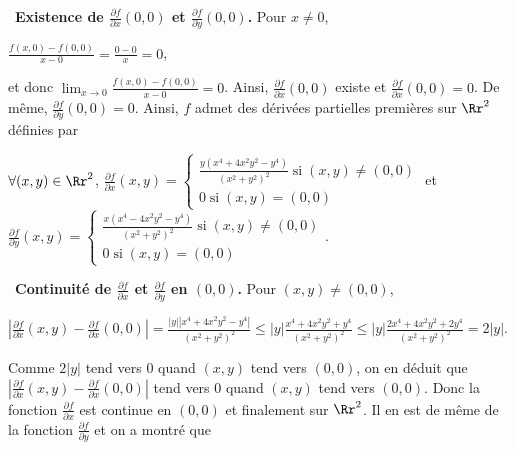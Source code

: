 {{\textbullet~\textbf{Existence de $ \frac{\partial f}{\partial x}(0,0)$ et $ \frac{\partial f}{\partial y}(0,0)$.} Pour $x\neq0$,

\begin{center}
$ \frac{f(x,0)-f(0,0)}{x-0}= \frac{0-0}{x}=0$,
\end{center}

et donc $\lim_{x \rightarrow 0} \frac{f(x,0)-f(0,0)}{x-0}=0$. Ainsi, $ \frac{\partial f}{\partial x}(0,0)$ existe et $ \frac{\partial f}{\partial x}(0,0)=0$. De même, $ \frac{\partial f}{\partial y}(0,0)=0$. Ainsi, $f$ admet des dérivées partielles premières sur $\Rr^2$ définies par

\begin{center}
$\forall(x,y)\in\Rr^2$, $ \frac{\partial f}{\partial x}(x,y)=\left\{
\begin{array}{l}
 \frac{y(x^4+4x^2y^2-y^4)}{(x^2+y^2)^2}\;\text{si}\;(x,y)\neq(0,0)\\
0\;\text{si}\;(x,y)=(0,0)
\end{array}
\right.$ et $ \frac{\partial f}{\partial y}(x,y)=\left\{
\begin{array}{l}
 \frac{x(x^4-4x^2y^2-y^4)}{(x^2+y^2)^2}\;\text{si}\;(x,y)\neq(0,0)\\
0\;\text{si}\;(x,y)=(0,0)
\end{array}
\right.$.
\end{center}

\textbullet~\textbf{Continuité de $ \frac{\partial f}{\partial x}$ et $ \frac{\partial f}{\partial y}$ en $(0,0)$.} Pour $(x,y)\neq(0,0)$,

\begin{center}
$\left| \frac{\partial f}{\partial x}(x,y)- \frac{\partial f}{\partial x}(0,0)\right|= \frac{|y||x^4+4x^2y^2-y^4|}{(x^2+y^2)^2}\leqslant|y| \frac{x^4+4x^2y^2+y^4}{(x^2+y^2)^2}\leqslant|y| \frac{2x^4+4x^2y^2+2y^4}{(x^2+y^2)^2}=2|y|$.
\end{center}

Comme $2|y|$ tend vers $0$ quand $(x,y)$ tend vers $(0,0)$, on en déduit que $\left| \frac{\partial f}{\partial x}(x,y)- \frac{\partial f}{\partial x}(0,0)\right|$ tend vers $0$ quand $(x,y)$ tend vers $(0,0)$. Donc la fonction $ \frac{\partial f}{\partial x}$ est continue en $(0,0)$ et finalement sur $\Rr^2$. Il en est de même de la fonction $ \frac{\partial f}{\partial y}$ et on a montré que

\begin{center}
\end{center}}
}